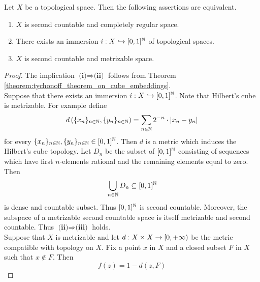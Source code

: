 \begin{corollary}\label{corollary:tychonoff_metrization_theorem}
Let $X$ be a topological space. Then the following assertions are equivalent.
\begin{enumerate}[label=\emph{\textbf{(\roman*)}}, leftmargin=*]
\item $X$ is second countable and completely regular space.
\item There exists an immersion $i:X\hookrightarrow [0,1]^{{\mathbb N}}$ of topological spaces.
\item $X$ is second countable and metrizable space.
\end{enumerate}
\end{corollary}
\begin{proof}
The implication $\textbf{(i)}\Rightarrow \textbf{(ii)}$ follows from Theorem \ref{theorem:tychonoff_theorem_on_cube_embeddings}.\\
Suppose that there exists an immersion $i:X\hookrightarrow [0,1]^{{\mathbb N}}$. Note that Hilbert's cube is metrizable. For example define
$$d\left(\{x_n\}_{n\in {\mathbb N}},\{y_n\}_{n\in {\mathbb N}}\right) = \sum_{n\in {\mathbb N}}2^{-n}\cdot |x_n - y_n|$$
for every $\{x_n\}_{n\in {\mathbb N}},\{y_n\}_{n\in {\mathbb N}} \in [0,1]^{{\mathbb N}}$. Then $d$ is a metric which induces the Hilbert's cube topology. Let $D_n$ be the subset of $[0,1]^{{\mathbb N}}$ consisting of sequences which have first $n$-elements rational and the remaining elements equal to zero. Then 
$$\bigcup_{n\in {\mathbb N}}D_n\subseteq [0,1]^{{\mathbb N}}$$
is dense and countable subset. Thus $[0,1]^{{\mathbb N}}$ is second countable. Moreover, the subspace of a metrizable second countable space is itself metrizable and second countable. Thus $\textbf{(ii)}\Rightarrow \textbf{(iii)}$ holds.\\
Suppose that $X$ is metrizable and let $d:X\times X \rightarrow [0,+\infty)$ be the metric compatible with topology on $X$. Fix a point $x$ in $X$ and a closed subset $F$ in $X$ such that $x\not \in F$. Then
$$f(z) = 1 - d(z,F)$$ 
\end{proof}





















\small


